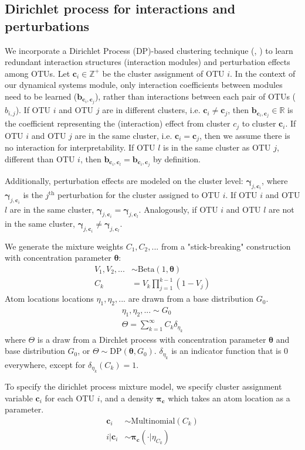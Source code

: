 \documentclass{article}
\newcommand{\R}{\mathbb{R}}
\newcommand{\Z}{\mathbb{Z}}
\newcommand{\Multinomialdist}{\text{Multinomial}}
\newcommand{\Betadist}{\text{Beta}}
\newcommand{\DPdist}{\text{DP}}
\renewcommand{\c}{\mathbf{c}}
\newcommand{\concc}{\mathbf{\theta}}
\newcommand{\probc}{\mathbf{\pi_{\c}}}
\newcommand{\bc}[2]{\mathbf{b}_{\c_{#1},\c_{#2}}}
\newcommand{\pertc}[1]{\mathbf{\gamma}_{j,\c_{#1}}}
\begin{document}
\subsection{Dirichlet process for interactions and perturbations}
\label{subsection:dirichlet process}
We incorporate a Dirichlet Process (DP)-based clustering technique (\cite{cite:neal2000}, \cite{cite:ramussen2000}) to learn redundant interaction structures (interaction modules) and perturbation effects among OTUs. Let $\c_i \in \Z^+$ be the cluster assignment of OTU $i$. In the context of our dynamical systems module, only interaction coefficients between modules need to be learned ($\bc{i}{j}$), rather than interactions between each pair of OTUs ($b_{i,j}$). If OTU $i$ and OTU $j$ are in different clusters, i.e. $\c_i \neq \c_j$, then $\bc{i}{j} \in \R$ is the coefficient representing the (interaction) effect from cluster $c_j$ to cluster $\c_i$. If OTU $i$
and OTU $j$ are in the same cluster, i.e. $\c_i = \c_j$, then we assume there is no interaction for interpretability. If OTU $l$ is in the same cluster as OTU $j$, different than OTU $i$, then $\bc{i}{l} = \bc{i}{j}$ by definition.

Additionally, perturbation effects are modeled on the cluster level: $\pertc{i}$, where $\pertc{i}$ is the $j^{\text{th}}$ perturbation for the cluster assigned to OTU $i$. If OTU $i$ and OTU $l$ are in the same cluster, $\pertc{i} = \pertc{l}$. Analogously, if OTU $i$ and OTU $l$ are not in the same cluster, $\pertc{i} \neq \pertc{l}$.

We generate the mixture weights $C_1, C_2,...$ from a "stick-breaking" construction with concentration parameter $\concc$:
\begin{align}
  V_1, V_2, ... & \sim \Betadist (1,\concc) \\
  C_k & = V_k \prod_{j=1}^{k-1}(1-V_j)
\end{align}
Atom locations locations $\eta_{1}, \eta_{2}, ...$ are drawn from a base distribution $G_0$.
\begin{align}
  \eta_1, \eta_2,... \sim G_0 \\
  \Theta = \sum_{k=1}^{\infty}C_k \delta_{\eta_k}
\end{align}
where $\Theta$ is a draw from a Dirchlet process with concentration parameter $\concc$ and base distribution $G_0$, or $\Theta \sim \DPdist(\concc, G_0)$. $\delta_{\eta_k}$ is an indicator function that is 0 everywhere, except for $\delta_{\eta_k}(C_k)=1$.

To specify the dirichlet process mixture model, we specify cluster assignment variable $\c_i$ for each OTU $i$, and a density $\probc$ which takes an atom location as a parameter.
\begin{align}
  \c_i & \sim \Multinomialdist (C_k) \\
  i | \c_i & \sim \probc( \cdot | \eta_{C_k})
\end{align}
\end{document}
